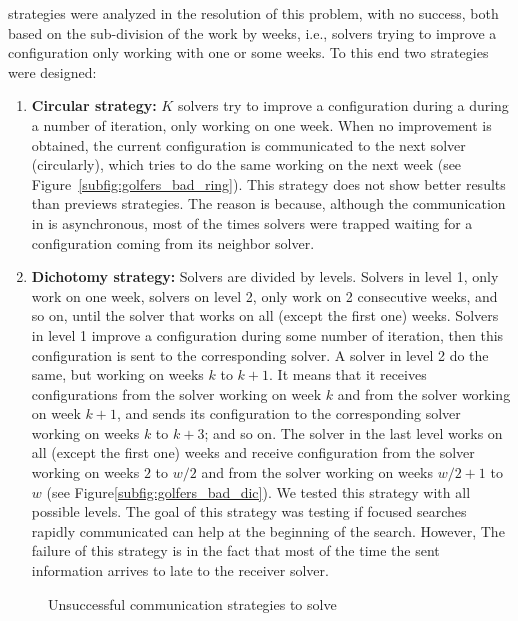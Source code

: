  strategies were analyzed in the resolution of this problem, with no success, both based on the sub-division of the work by weeks, i.e., solvers trying to improve a configuration only working with one or some weeks. To this end two strategies were designed:

\begin{enumerate}[label=\Alph*]
\item \textbf{Circular strategy:} $K$ solvers try to improve a configuration during a during a number of iteration, only working on one week. When no improvement is obtained, the current configuration is communicated to the next solver (circularly), which tries to do the same working on the next week (see Figure~\ref{subfig:golfers_bad_ring}).
\subitem This strategy does not show better results than previews strategies. The reason is because, although the communication in \posl{} is asynchronous, most of the times solvers were trapped waiting for a configuration coming from its neighbor solver.

\item \textbf{Dichotomy strategy:} Solvers are divided by levels. Solvers in level 1, only work on one week, solvers on level 2, only work on 2 consecutive weeks, and so on, until the solver that works on all (except the first one) weeks. Solvers in level 1 improve a configuration during some number of iteration, then this configuration is sent to the corresponding solver. A solver in level 2 do the same, but working on weeks $k$ to $k+1$. It means that it receives configurations from the solver working on week $k$ and from the solver working on week $k+1$, and sends its configuration to the corresponding solver working on weeks $k$ to $k+3$; and so on. The solver in the last level works on all (except the first one) weeks and receive configuration from the solver working on weeks $2$ to $w/2$ and from the solver working on weeks $w/2+1$ to $w$ (see Figure\ref{subfig:golfers_bad_dic}). We tested this strategy with all possible levels. 
\subitem The goal of this strategy was testing if focused searches rapidly communicated can help at the beginning of the search. However, The failure of this strategy is in the fact that most of the time the sent information arrives to late to the receiver solver.
\end{enumerate}

\begin{figure}[h]
	\centering
	\caption[]{Unsuccessful communication strategies to solve \SGP}
	\label{fig:golfers_bad}
\end{figure}